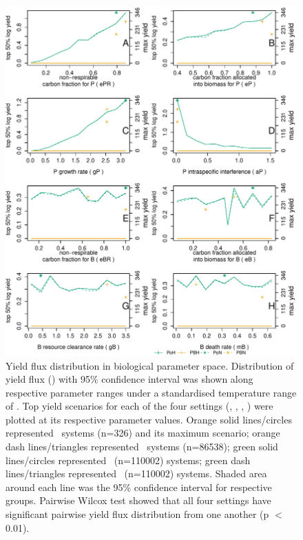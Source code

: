 \documentclass[../thesis.tex]{subfiles} %
\begin{document}
\begin{figure}[H]
    \centering
    \includegraphics[width=\linewidth]{result/yieldFlux.pdf}
    \caption[Yield flux distribution in biological parameter space]{Yield flux distribution in biological parameter space.  Distribution of yield flux (\dxdt) with 95\% confidence interval was shown along respective parameter ranges under a standardised temperature range of \temp.  Top yield scenarios for each of the four settings (\PBH, \PoH, \PBN, \PoN) were plotted at its respective parameter values.  Orange solid lines/circles represented \PBH\ systems (n=326) and its maximum scenario; orange dash lines/triangles represented \PBN\ systems (n=86538); green solid lines/circles represented \PoH\ (n=110002) systems; green dash lines/triangles represented \PoN\ (n=110002) systems.  Shaded area around each line was the 95\% confidence interval for respective groups.  Pairwise Wilcox test showed that all four settings have significant pairwise yield flux distribution from one another (p $<$ 0.01).}
    \label{f:ydByPara}
\end{figure}
\end{document}
